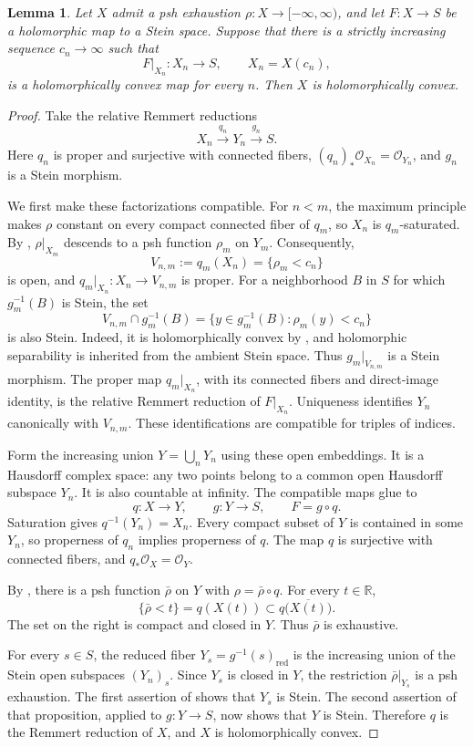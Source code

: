 \documentclass[11pt]{amsart}
\newtheorem{lemma}[theorem]{Lemma}
\theoremstyle{definition}
\theoremstyle{remark}
\numberwithin{equation}{section}
\newcommand{\R}{\mathbb R}
\newcommand{\OO}{\mathcal O}
\begin{document}
\begin{lemma}
\label{lem:sublevel-descent}
Let $X$ admit a psh exhaustion $\rho:X\to[-\infty,\infty)$,
and let $F:X\to S$ be a holomorphic map to a Stein space.
Suppose that there is a strictly increasing sequence
$c_n\to\infty$ such that
\[
 F|_{X_n}:X_n\longrightarrow S,\qquad X_n=X(c_n),
\]
is a holomorphically convex map for every $n$.
Then $X$ is holomorphically convex.
\end{lemma}

\begin{proof}
Take the relative Remmert reductions \cite{KnorrSchneider1971}
\[
 X_n\xrightarrow{q_n}Y_n\xrightarrow{g_n}S.
\]
Here $q_n$ is proper and surjective with connected fibers,
$(q_n)_*\OO_{X_n}=\OO_{Y_n}$, and $g_n$ is a Stein morphism.

We first make these factorizations compatible.
For $n<m$, the maximum principle makes $\rho$ constant on
every compact connected fiber of $q_m$, so $X_n$ is
$q_m$-saturated. By \cite[Proposition~3.1]{Vajaitu2022},
$\rho|_{X_m}$ descends to a psh function $\rho_m$ on $Y_m$.
Consequently,
\[
 V_{n,m}:=q_m(X_n)=\{\rho_m<c_n\}
\]
is open, and $q_m|_{X_n}:X_n\to V_{n,m}$ is proper.
For a neighborhood $B$ in $S$ for which $g_m^{-1}(B)$ is Stein,
the set
\[
 V_{n,m}\cap g_m^{-1}(B)
 =\{y\in g_m^{-1}(B):\rho_m(y)<c_n\}
\]
is also Stein. Indeed, it is holomorphically convex by
\cite[Proposition~4.4]{Vajaitu2022}, and holomorphic
separability is inherited from the ambient Stein space.
Thus $g_m|_{V_{n,m}}$ is a Stein morphism.
The proper map $q_m|_{X_n}$, with its connected fibers and
direct-image identity, is the relative Remmert reduction of
$F|_{X_n}$. Uniqueness identifies $Y_n$ canonically with
$V_{n,m}$. These identifications are compatible for triples
of indices.

Form the increasing union $Y=\bigcup_nY_n$ using these open
embeddings. It is a Hausdorff complex space: any two points
belong to a common open Hausdorff subspace $Y_n$.
It is also countable at infinity. The compatible maps glue to
\[
 q:X\longrightarrow Y,\qquad g:Y\longrightarrow S,
 \qquad F=g\circ q.
\]
Saturation gives $q^{-1}(Y_n)=X_n$. Every compact subset of
$Y$ is contained in some $Y_n$, so properness of $q_n$ implies
properness of $q$. The map $q$ is surjective with connected
fibers, and $q_*\OO_X=\OO_Y$.

By \cite[Proposition~3.1]{Vajaitu2022}, there is a psh function
$\bar\rho$ on $Y$ with $\rho=\bar\rho\circ q$.
For every $t\in\R$,
\[
 \{\bar\rho<t\}=q(X(t))
 \subset q\bigl(\overline{X(t)}\bigr).
\]
The set on the right is compact and closed in $Y$.
Thus $\bar\rho$ is exhaustive.

For every $s\in S$, the reduced fiber
$Y_s=g^{-1}(s)_{\mathrm{red}}$ is the increasing union of
the Stein open subspaces $(Y_n)_s$.
Since $Y_s$ is closed in $Y$, the restriction
$\bar\rho|_{Y_s}$ is a psh exhaustion.
The first assertion of \cite[Proposition~4.2]{Vajaitu2022}
shows that $Y_s$ is Stein. The second assertion of that
proposition, applied to $g:Y\to S$, now shows that $Y$ is
Stein. Therefore $q$ is the Remmert reduction of $X$, and
$X$ is holomorphically convex.
\end{proof}
\end{document}
